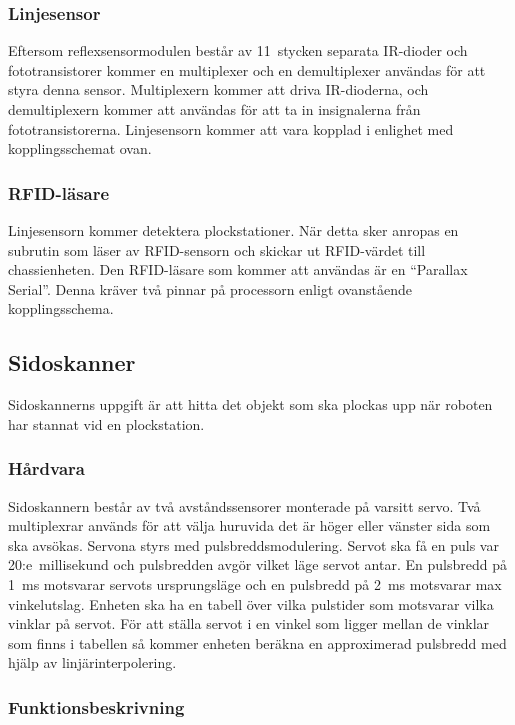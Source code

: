 \subsubsection{Linjesensor}
Eftersom reflexsensormodulen består av 11~stycken separata IR-dioder och fototransistorer kommer en multiplexer och en demultiplexer användas för att styra denna sensor. Multiplexern kommer att driva IR-dioderna, och demultiplexern kommer att användas för att ta in insignalerna från fototransistorerna. Linjesensorn kommer att vara kopplad i enlighet med kopplingsschemat ovan.


\subsubsection{RFID-läsare}
Linjesensorn kommer detektera plockstationer. När detta sker anropas en subrutin som läser av RFID-sensorn och skickar ut RFID-värdet till chassienheten. Den RFID-läsare som kommer att användas är en “Parallax Serial”. Denna kräver två pinnar på processorn enligt ovanstående kopplingsschema.


\subsection{Sidoskanner}
Sidoskannerns uppgift är att hitta det objekt som ska plockas upp när roboten har stannat vid en plockstation. 


\subsubsection{Hårdvara}

Sidoskannern består av två avståndssensorer monterade på varsitt servo. Två multiplexrar används för att välja huruvida det är höger eller vänster sida som ska avsökas. Servona styrs med pulsbreddsmodulering. Servot ska få en puls var 20:e~millisekund och pulsbredden avgör vilket läge servot antar. En pulsbredd på 1~ms motsvarar servots ursprungsläge och en pulsbredd på 2~ms motsvarar max vinkelutslag. Enheten ska ha en tabell över vilka pulstider som motsvarar vilka vinklar på servot. För att ställa servot i en vinkel som ligger mellan de vinklar som finns i tabellen så kommer enheten beräkna en approximerad pulsbredd med hjälp av linjärinterpolering.

\subsubsection{Funktionsbeskrivning}

